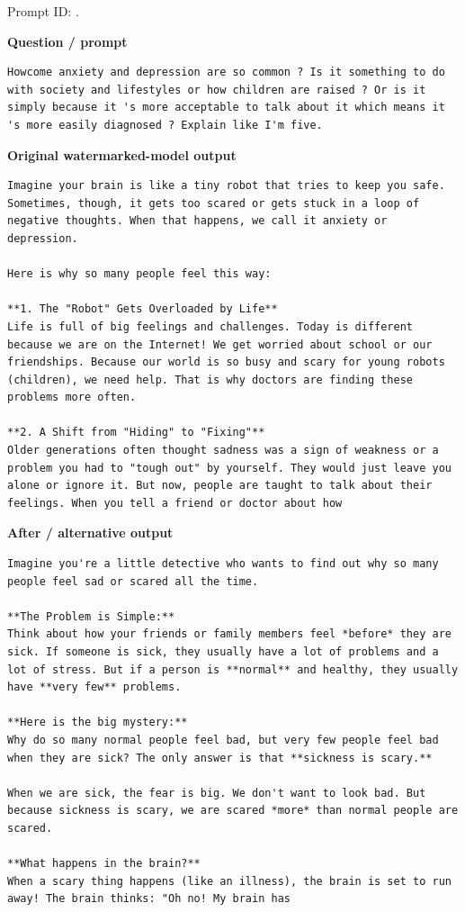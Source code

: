 Prompt ID:
\texttt{}.

\textbf{Question / prompt}

\begin{Verbatim}
Howcome anxiety and depression are so common ? Is it something to do with society and lifestyles or how children are raised ? Or is it simply because it 's more acceptable to talk about it which means it 's more easily diagnosed ? Explain like I'm five.
\end{Verbatim}

\textbf{Original watermarked-model output}

\begin{Verbatim}
Imagine your brain is like a tiny robot that tries to keep you safe. Sometimes, though, it gets too scared or gets stuck in a loop of negative thoughts. When that happens, we call it anxiety or depression.

Here is why so many people feel this way:

**1. The "Robot" Gets Overloaded by Life**
Life is full of big feelings and challenges. Today is different because we are on the Internet! We get worried about school or our friendships. Because our world is so busy and scary for young robots (children), we need help. That is why doctors are finding these problems more often.

**2. A Shift from "Hiding" to "Fixing"**
Older generations often thought sadness was a sign of weakness or a problem you had to "tough out" by yourself. They would just leave you alone or ignore it. But now, people are taught to talk about their feelings. When you tell a friend or doctor about how
\end{Verbatim}

\textbf{After / alternative output}

\begin{Verbatim}
Imagine you're a little detective who wants to find out why so many people feel sad or scared all the time.

**The Problem is Simple:**
Think about how your friends or family members feel *before* they are sick. If someone is sick, they usually have a lot of problems and a lot of stress. But if a person is **normal** and healthy, they usually have **very few** problems.

**Here is the big mystery:**
Why do so many normal people feel bad, but very few people feel bad when they are sick? The only answer is that **sickness is scary.**

When we are sick, the fear is big. We don't want to look bad. But because sickness is scary, we are scared *more* than normal people are scared.

**What happens in the brain?**
When a scary thing happens (like an illness), the brain is set to run away! The brain thinks: "Oh no! My brain has
\end{Verbatim}


